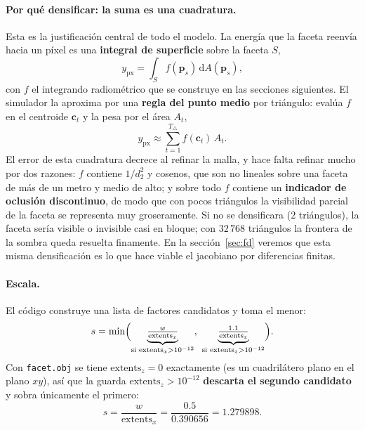 \documentclass[11pt,a4paper]{article}
\newcommand{\vect}[1]{\boldsymbol{#1}}
\newcommand{\code}[1]{\texttt{#1}}
\newcommand{\dd}{\mathrm{d}}
\theoremstyle{definition}
\theoremstyle{plain}
\begin{document}
\paragraph{Por qué densificar: la suma es una cuadratura.}
Esta es la justificación central de todo el modelo. La energía que la faceta
reenvía hacia un píxel es una \textbf{integral de superficie} sobre la faceta
$S$,
%
\begin{equation}
\label{eq:integral}
y_{\text{px}} = \int_S f(\vect p_s)\,\dd A(\vect p_s),
\end{equation}
%
con $f$ el integrando radiométrico que se construye en las secciones
siguientes. El simulador la aproxima por una \textbf{regla del punto medio} por
triángulo: evalúa $f$ en el centroide $\vect c_t$ y la pesa por el área
$A_t$,
%
\begin{equation}
\label{eq:cuadratura}
y_{\text{px}} \approx \sum_{t=1}^{T_\triangle} f(\vect c_t)\,A_t .
\end{equation}
%
El error de esta cuadratura decrece al refinar la malla, y hace falta refinar
mucho por dos razones: $f$ contiene $1/d_2^2$ y cosenos, que son no lineales
sobre una faceta de más de un metro y medio de alto; y sobre todo $f$ contiene
un \textbf{indicador de oclusión discontinuo}, de modo que con pocos triángulos
la visibilidad parcial de la faceta se representa muy groseramente. Si no se
densificara ($2$ triángulos), la faceta sería visible o invisible casi en
bloque; con $32\,768$ triángulos la frontera de la sombra queda resuelta
finamente. En la sección~\ref{sec:fd} veremos que esta misma densificación es lo
que hace viable el jacobiano por diferencias finitas.

\paragraph{Escala.}
El código construye una lista de factores candidatos y toma el menor:
%
\begin{equation}
\label{eq:escala}
s = \min\Bigl(\underbrace{\tfrac{w}{\text{extents}_x}}_{\text{si } \text{extents}_x>10^{-12}},\
              \underbrace{\tfrac{1.1}{\text{extents}_z}}_{\text{si } \text{extents}_z>10^{-12}}\Bigr).
\end{equation}
%
Con \code{facet.obj} se tiene $\text{extents}_z=0$ exactamente (es un
cuadrilátero plano en el plano $xy$), así que la guarda
$\text{extents}_z>10^{-12}$ \textbf{descarta el segundo candidato} y sobra
únicamente el primero:
%
\begin{equation}
s = \frac{w}{\text{extents}_x} = \frac{0.5}{0.390656} = 1.279898 .
\end{equation}
\end{document}
